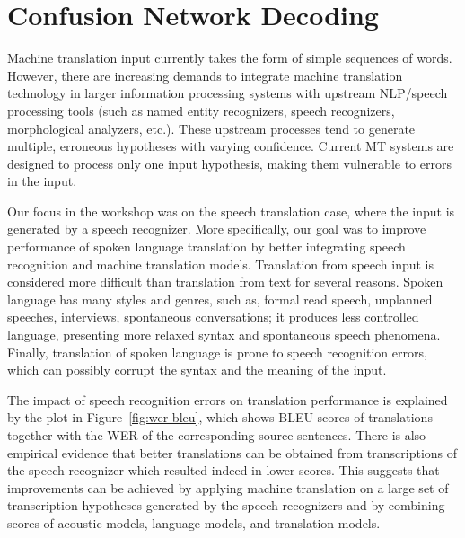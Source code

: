 \documentclass[11pt]{report}
\theoremstyle{plain}
\begin{document}
\chapter{Confusion Network Decoding}\label{chap:confusion-networks}

\def\x{{\mathbf x}}
\def\L{{\cal L}}
\newcommand{\devfour}{{\tt dev4}}
\newcommand{\eval}{{\tt eval}}
\newcommand{\E}{{\bf e}}
\newcommand{\F}{{\bf f}}
\newcommand{\bm}[1]{{\mbox{\boldmath${#1}$}}}
\newcommand{\tf}{\tilde{f}}
\newcommand{\te}{\tilde{e}}
\newcommand{\teb}{{\bf \te}}


Machine translation input currently takes the form of simple sequences of words. 
However, there are increasing demands to integrate machine translation technology 
in larger information processing systems with upstream NLP/speech processing tools 
(such as named entity  recognizers, speech recognizers, morphological analyzers, etc.). 
These upstream processes tend to generate multiple, erroneous hypotheses with 
varying confidence.  Current MT systems are designed to process only one input 
hypothesis, making them vulnerable to errors in the input.  

\noindent
Our  focus in the workshop was on the speech translation case, where the input is 
generated by a speech recognizer.  More specifically, our goal was  to improve performance 
of spoken language translation by better integrating  speech recognition and 
machine translation  models. Translation from speech input is considered  more difficult than 
translation from text for several reasons. Spoken language has many  styles and 
genres, such as, formal read speech, unplanned speeches, interviews, spontaneous 
conversations;  it produces less controlled language, presenting more relaxed syntax 
and spontaneous speech phenomena. Finally, translation of spoken language is prone 
to speech recognition  errors, which can  possibly corrupt the  syntax and the meaning of 
the input.

The impact of speech recognition errors on translation performance
is explained by the plot in Figure~\ref{fig:wer-bleu}, which shows BLEU scores of 
translations together with the WER of the corresponding source sentences.  There is
also empirical evidence that better translations can be obtained from 
transcriptions of the speech recognizer which resulted indeed in lower scores.  This
suggests that improvements can be achieved by applying machine translation on 
a large set of transcription hypotheses generated by the speech recognizers and by
combining scores of  acoustic models, language models, and translation models.
\end{document}
